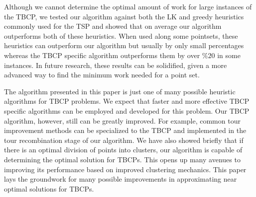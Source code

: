 \documentclass[sigconf, anonymous, pdftex]{acmart}
\begin{document}
Although we cannot determine the optimal amount of work for large instances of the TBCP, we tested our algorithm against both the LK and greedy heuristics commonly used for the TSP and showed that on average our algorithm outperforms both of these heuristics. When used along some pointsets, these heuristics can outperform our algorithm but usually by only small percentages whereas the TBCP specific algorithm outperforms them by over $\%20$ in some instances. In future research, these results can be solidified, given a more advanced way to find the minimum work needed for a point set.

The algorithm presented in this paper is just one of many possible heuristic algorithms for TBCP problems. We expect that faster and more effective TBCP specific algorithms can be employed and developed for this problem. Our TBCP algorithm, however, still can be greatly improved. For example, common tour improvement methods can be specialized to the TBCP and implemented in the tour recombination stage of our algorithm. We have also showed briefly that if there is an optimal division of points into clusters, our algorithm is capable of determining the optimal solution for TBCPs. This opens up many avenues to improving its performance based on improved clustering mechanics. This paper lays the groundwork for many possible improvements in approximating near optimal solutions for TBCPs.



\end{document}
